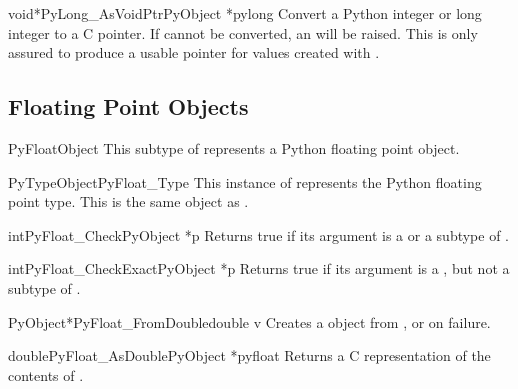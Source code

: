 \begin{cfuncdesc}{void*}{PyLong_AsVoidPtr}{PyObject *pylong}
  Convert a Python integer or long integer  to a C
   pointer.  If  cannot be converted, an
   will be raised.  This is only assured to
  produce a usable  pointer for values created with
  .
\end{cfuncdesc}


\subsection{Floating Point Objects \label{floatObjects}}

\begin{ctypedesc}{PyFloatObject}
  This subtype of  represents a Python floating point
  object.
\end{ctypedesc}

\begin{cvardesc}{PyTypeObject}{PyFloat_Type}
  This instance of  represents the Python floating
  point type.  This is the same object as .
\end{cvardesc}

\begin{cfuncdesc}{int}{PyFloat_Check}{PyObject *p}
  Returns true if its argument is a  or a subtype
  of .
\end{cfuncdesc}

\begin{cfuncdesc}{int}{PyFloat_CheckExact}{PyObject *p}
  Returns true if its argument is a , but not a
  subtype of .
\end{cfuncdesc}

\begin{cfuncdesc}{PyObject*}{PyFloat_FromDouble}{double v}
  Creates a  object from , or \NULL{} on
  failure.
\end{cfuncdesc}

\begin{cfuncdesc}{double}{PyFloat_AsDouble}{PyObject *pyfloat}
  Returns a C  representation of the contents of
  .
\end{cfuncdesc}

